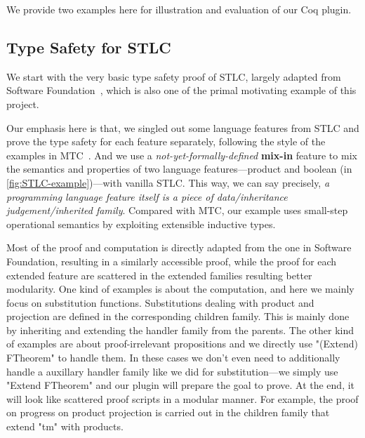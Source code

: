 We provide two examples here for illustration and evaluation of our Coq plugin. 

\subsection{Type Safety for STLC}
We start with the very basic type safety proof of STLC, largely adapted
from Software Foundation~\cite{pierce2014software}, which is also one of
the primal motivating example of this project. 

Our emphasis here is that, we singled out some language features from
STLC and prove the type safety for each feature separately, following
the style of the examples in MTC~\cite{delaware2013,forsta2020}.
And we use a \textit{not-yet-formally-defined} \textbf{mix-in} feature
to mix the semantics and properties of two language features---product
and boolean (in \cref{fig:STLC-example})---with vanilla STLC. This way,
we can say precisely, \textit{a programming language feature itself is a
piece of data/inheritance judgement/inherited family}. Compared with MTC,
our example uses small-step operational semantics by exploiting
extensible inductive types. 

Most of the proof and computation is directly adapted
from the one in Software Foundation, resulting in a similarly accessible proof, while the proof for each extended feature are scattered in the extended families resulting better modularity. One kind of examples is about the computation, and here we mainly focus on substitution functions. Substitutions dealing with product and projection are defined in the corresponding children family. This is mainly done by inheriting and extending the handler family from the parents. The other kind of examples are about proof-irrelevant propositions and we directly use "(Extend) FTheorem" to handle them. In these cases we don't even need to additionally handle a auxillary handler family like we did for substitution---we simply use "Extend FTheorem" and our plugin will prepare the goal to prove. At the end, it will look like scattered proof scripts in a modular manner.
For example, the proof on progress on product projection is carried out in the children family that extend "tm" with products. 

